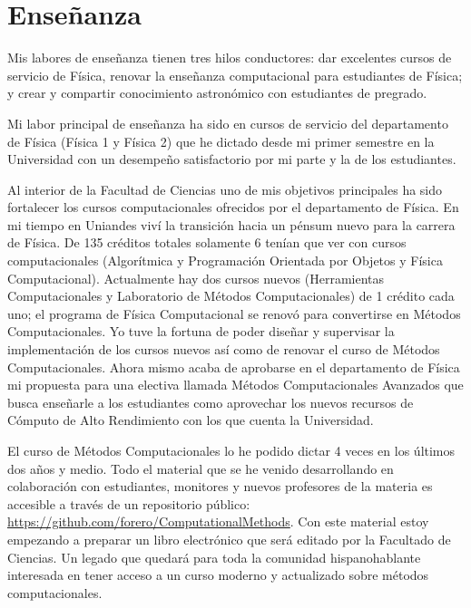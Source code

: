 \documentclass[letterpaper,12pt,onecolumn]{article}
\begin{document}
\pagestyle{empty}
\section*{{\Large{\sc Ense\~nanza}}}

Mis labores de ense\~nanza tienen tres hilos conductores: dar excelentes
cursos de servicio de F\'isica, renovar la ense\~nanza computacional
para estudiantes de F\'isica; y crear y compartir conocimiento
astron\'omico con estudiantes de pregrado.

Mi labor principal de ense\~nanza ha sido en cursos de servicio del
departamento de F\'isica (F\'isica 1 y F\'isica 2) que he dictado desde mi
primer semestre en la Universidad con un desempe\~no satisfactorio por
mi parte y la de los estudiantes.

Al interior de la Facultad de Ciencias uno de mis objetivos
principales ha sido fortalecer los cursos computacionales ofrecidos por
el departamento de F\'isica. En mi tiempo en Uniandes viv\'i la transici\'on
hacia un p\'ensum nuevo para la carrera de F\'isica. De 135 cr\'editos
totales solamente 6 ten\'ian que ver con cursos computacionales
(Algor\'itmica y Programaci\'on Orientada por Objetos y 
F\'isica Computacional). Actualmente hay dos cursos nuevos (Herramientas
Computacionales y Laboratorio de M\'etodos Computacionales) de 1 cr\'edito
 cada uno; el programa de F\'isica Computacional se renov\'o para convertirse en
M\'etodos Computacionales. Yo tuve la fortuna de poder dise\~nar y
supervisar la implementaci\'on de los cursos nuevos as\'i como de renovar
el curso de M\'etodos  Computacionales. Ahora mismo acaba de aprobarse
en el departamento de F\'isica mi propuesta para una electiva llamada
M\'etodos Computacionales Avanzados que busca ense\~narle a los
estudiantes como aprovechar los nuevos  recursos de C\'omputo de Alto
Rendimiento con los que cuenta la Universidad.


El curso de M\'etodos Computacionales lo he podido dictar 4 veces en los
\'ultimos dos a\~nos y medio. Todo el material que se he venido
desarrollando en colaboraci\'on con estudiantes, monitores y nuevos
profesores de la materia es accesible a trav\'es de un
repositorio p\'ublico: \url{https://github.com/forero/ComputationalMethods}.
Con este material estoy empezando a preparar un libro electr\'onico que
ser\'a editado por la Facultado de Ciencias. Un legado que quedar\'a para
toda la comunidad hispanohablante interesada en tener acceso a un
curso moderno y actualizado sobre m\'etodos computacionales.
\end{document}

